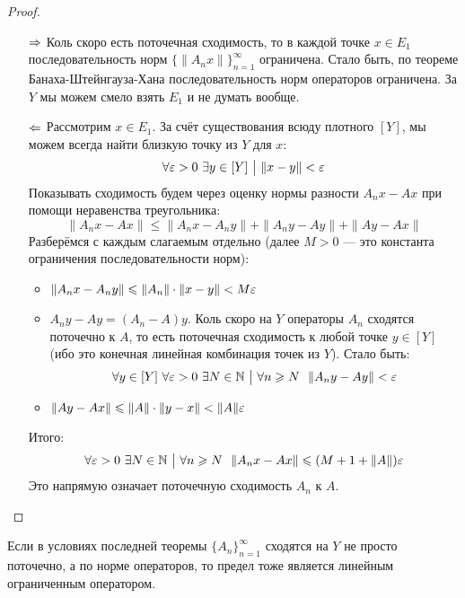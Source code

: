 \begin{proof}~
	\begin{itemize}
		\item[$\Rightarrow$] Коль скоро есть поточечная сходимость, то в каждой точке $x \in E_1$ последовательность норм $\{\|A_nx\|\}_{n = 1}^\infty$ ограничена. Стало быть, по теореме Банаха-Штейнгауза-Хана последовательность норм операторов ограничена. За $Y$ мы можем смело взять $E_1$ и не думать вообще.
		
		\item[$\Leftarrow$] Рассмотрим $x \in E_1$. За счёт существования всюду плотного $[Y]$, мы можем всегда найти близкую точку из $Y$ для $x$:
		\[
			\forall \varepsilon > 0\ \exists y \in [Y] \ \big|\  \|x - y\| < \varepsilon
		\]
		Показывать сходимость будем через оценку нормы разности $A_nx - Ax$ при помощи неравенства треугольника:
		\[
			\|A_nx - Ax\| \le \|A_nx - A_ny\| + \|A_ny - Ay\| + \|Ay - Ax\|
		\]
		Разберёмся с каждым слагаемым отдельно (далее $M > 0$ --- это константа ограничения последовательности норм):
		\begin{itemize}
			\item $\|A_nx - A_ny\| \leqslant \|A_n\| \cdot \|x - y\| < M \varepsilon$
			
			\item $A_ny - Ay = (A_n - A)y$. Коль скоро на $Y$ операторы $A_n$ сходятся поточечно к $A$, то есть поточечная сходимость к любой точке $y \in [Y]$ (ибо это конечная линейная комбинация точек из $Y$). Стало быть:
			\[
				\forall y \in [Y]\ \forall \varepsilon > 0\ \exists N \in \mathbb{N} \ \big|\  \forall n \geqslant N\ \ \|A_ny - Ay\| < \varepsilon
			\]
			
			\item $\|Ay - Ax\| \leqslant \|A\| \cdot \|y - x\| < \|A\|\varepsilon$
		\end{itemize}
		Итого:
		\[
			\forall \varepsilon > 0\ \exists N \in \mathbb{N} \ \big|\  \forall n \geqslant N\ \ \|A_nx - Ax\| \leqslant (M + 1 + \|A\|)\varepsilon
		\]
		Это напрямую означает поточечную сходимость $A_n$ к $A$.
	\end{itemize}
\end{proof}

\begin{corollary}
	Если в условиях последней теоремы $\{A_n\}_{n = 1}^\infty$ сходятся на $Y$ не просто поточечно, а по норме операторов, то предел тоже является линейным ограниченным оператором.
\end{corollary}

